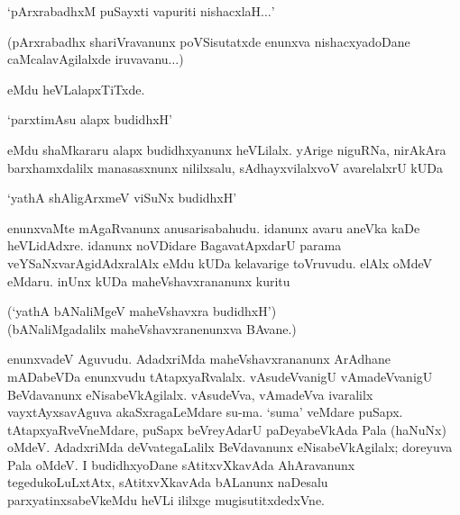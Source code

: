 \begin{shloka}
`pArxrabadhxM puSayxti vapuriti nishacxlaH$\ldots$'
\end{shloka}

(pArxrabadhx shariVravanunx poVSisutatxde enunxva nishacxyadoDane caMcalavAgilalxde iruvavanu$\ldots$)

eMdu heVLalapxTiTxde.

\begin{shloka}
`parxtimAsu alapx budidhxH'
\end{shloka}

\noindent eMdu shaMkararu alapx budidhxyanunx heVLilalx. yArige niguRNa, nirAkAra barxhamxdalilx manasasxnunx nililxsalu, sAdhayxvilalxvoV avarelalxrU kUDa

\begin{shloka}
`yathA shAligArxmeV viSuNx budidhxH'
\end{shloka}

\noindent enunxvaMte mAgaRvanunx anusarisabahudu. idanunx avaru aneVka kaDe heVLidAdxre. idanunx noVDidare BagavatApxdarU parama veYSaNxvarAgidAdxralAlx eMdu kUDa kelavarige toVruvudu. elAlx oMdeV eMdaru. inUnx kUDa maheVshavxrananunx kuritu


\begin{shloka}
(`yathA bANaliMgeV maheVshavxra budidhxH')\\
(bANaliMgadalilx maheVshavxranenunxva BAvane.)
\end{shloka}

\noindent enunxvadeV Aguvudu. AdadxriMda maheVshavxrananunx ArAdhane mADabeVDa enunxvudu tAtapxyaRvalalx. vAsudeVvanigU vAmadeVvanigU BeVdavanunx eNisabeVkAgilalx. vAsudeVva, vAmadeVva ivaralilx vayxtAyxsavAguva akaSxragaLeMdare su-ma. `suma' veMdare puSapx. tAtapxyaRveVneMdare, puSapx beVreyAdarU paDeyabeVkAda Pala (haNuNx) oMdeV. AdadxriMda deVvategaLalilx BeVdavanunx eNisabeVkAgilalx; doreyuva Pala oMdeV. I budidhxyoDane sAtitxvXkavAda AhAravanunx tegedukoLuLxtAtx, sAtitxvXkavAda bALanunx naDesalu parxyatinxsabeVkeMdu heVLi ililxge mugisutitxdedxVne.



\endchapter
